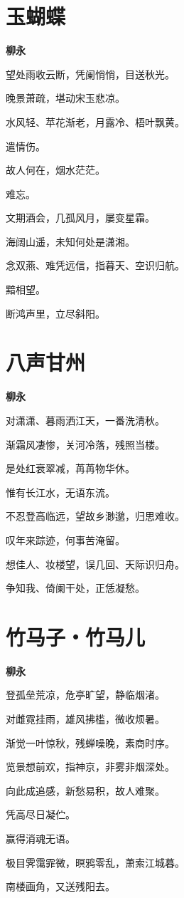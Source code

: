 \documentclass[12pt,a4paper]{ctexbook}
\begin{document}
\section{玉蝴蝶}
\textbf{柳永}\par\vspace{0.5em}
望处雨收云断，凭阑悄悄，目送秋光。\par
晚景萧疏，堪动宋玉悲凉。\par
水风轻、苹花渐老，月露冷、梧叶飘黄。\par
遣情伤。\par
故人何在，烟水茫茫。\par
难忘。\par
文期酒会，几孤风月，屡变星霜。\par
海阔山遥，未知何处是潇湘。\par
念双燕、难凭远信，指暮天、空识归航。\par
黯相望。\par
断鸿声里，立尽斜阳。\par

\section{八声甘州}
\textbf{柳永}\par\vspace{0.5em}
对潇潇、暮雨洒江天，一番洗清秋。\par
渐霜风凄惨，关河冷落，残照当楼。\par
是处红衰翠减，苒苒物华休。\par
惟有长江水，无语东流。\par
不忍登高临远，望故乡渺邈，归思难收。\par
叹年来踪迹，何事苦淹留。\par
想佳人、妆楼望，误几回、天际识归舟。\par
争知我、倚阑干处，正恁凝愁。\par

\section{竹马子・竹马儿}
\textbf{柳永}\par\vspace{0.5em}
登孤垒荒凉，危亭旷望，静临烟渚。\par
对雌霓挂雨，雄风拂槛，微收烦暑。\par
渐觉一叶惊秋，残蝉噪晚，素商时序。\par
览景想前欢，指神京，非雾非烟深处。\par
向此成追感，新愁易积，故人难聚。\par
凭高尽日凝伫。\par
赢得消魂无语。\par
极目霁霭霏微，暝鸦零乱，萧索江城暮。\par
南楼画角，又送残阳去。\par
\end{document}
